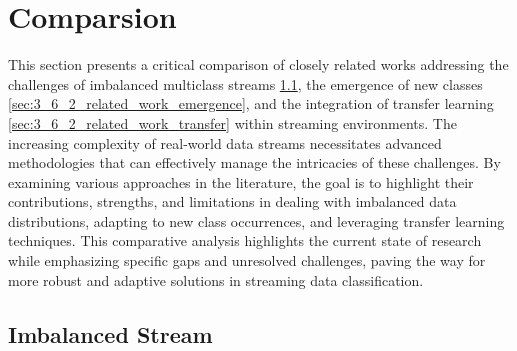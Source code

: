 \section{Comparsion} 
\label{sec:3_6_comparsion}

This section presents a critical comparison of closely related works addressing the challenges of imbalanced multiclass streams \ref{sec:3_6_1_related_work_imbalanced}, the emergence of new classes \ref{sec:3_6_2_related_work_emergence}, and the integration of transfer learning \ref{sec:3_6_2_related_work_transfer} within streaming environments. The increasing complexity of real-world data streams necessitates advanced methodologies that can effectively manage the intricacies of these challenges. By examining various approaches in the literature, the goal is to highlight their contributions, strengths, and limitations in dealing with imbalanced data distributions, adapting to new class occurrences, and leveraging transfer learning techniques. This comparative analysis highlights the current state of research while emphasizing specific gaps and unresolved challenges, paving the way for more robust and adaptive solutions in streaming data classification.


\subsection{Imbalanced Stream}
\label{sec:3_6_1_related_work_imbalanced}

